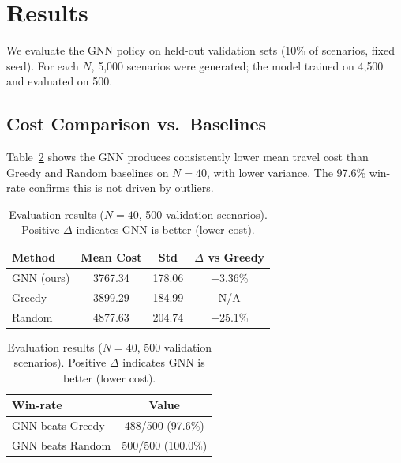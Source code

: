\documentclass[conference]{IEEEtran}
\begin{document}
\section{Results}\label{sec:results}

We evaluate the GNN policy on held-out validation sets (10\% of scenarios, fixed seed). For each $N$, 5{,}000 scenarios were generated; the model trained on 4{,}500 and evaluated on 500.


\subsection{Cost Comparison vs.\ Baselines}

Table~\ref{tab:results_40obj} shows the GNN produces consistently lower mean travel cost than Greedy and Random baselines on $N{=}40$, with lower variance. The 97.6\% win-rate confirms this is not driven by outliers.

\begin{table}[htbp]
\caption{Evaluation results ($N{=}40$, 500 validation scenarios). Positive $\Delta$ indicates GNN is better (lower cost).}
\label{tab:results_40obj}
\centering
\begin{tabular}{@{}lccc@{}}
\toprule
\textbf{Method} & \textbf{Mean Cost} & \textbf{Std} & \textbf{$\Delta$ vs Greedy} \\
\midrule
GNN (ours) & 3767.34 & 178.06 & +3.36\% \\
Greedy & 3899.29 & 184.99 & \multicolumn{1}{c}{N/A} \\
Random & 4877.63 & 204.74 & $-$25.1\% \\
\bottomrule
\end{tabular}

\vspace{2mm}
\begin{tabular}{@{}lc@{}}
\toprule
\textbf{Win-rate} & \textbf{Value} \\
\midrule
GNN beats Greedy & 488/500 (97.6\%) \\
GNN beats Random & 500/500 (100.0\%) \\
\bottomrule
\end{tabular}
\end{table}
\end{document}
